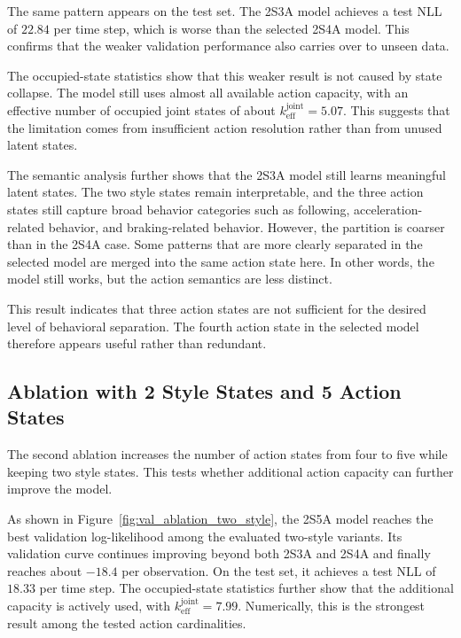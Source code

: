 \par The same pattern appears on the test set. 
The 2S3A model achieves a test \ac{NLL} of \(22.84\) per time step, which is worse than the selected 2S4A model. 
This confirms that the weaker validation performance also carries over to unseen data.

\par The occupied-state statistics show that this weaker result is not caused by state collapse. 
The model still uses almost all available action capacity, with an effective number of occupied joint states of about \(k_{\mathrm{eff}}^{\mathrm{joint}}=5.07\). 
This suggests that the limitation comes from insufficient action resolution rather than from unused latent states.


\par The semantic analysis further shows that the 2S3A model still learns meaningful latent states. 
The two style states remain interpretable, and the three action states still capture broad behavior categories such as following, acceleration-related behavior, 
and braking-related behavior. 
However, the partition is coarser than in the 2S4A case. 
Some patterns that are more clearly separated in the selected model are merged into the same action state here.  
In other words, the model still works, but the action semantics are less distinct.

\par This result indicates that three action states are not sufficient for the desired level of behavioral separation. 
The fourth action state in the selected model therefore appears useful rather than redundant.


\subsection{Ablation with 2 Style States and 5 Action States}
The second ablation increases the number of action states from four to five while keeping two style states. 
This tests whether additional action capacity can further improve the model.

\par As shown in Figure~\ref{fig:val_ablation_two_style}, the 2S5A model reaches the best validation log-likelihood among the evaluated two-style variants. 
Its validation curve continues improving beyond both 2S3A and 2S4A and finally reaches about \(-18.4\) per observation. 
On the test set, it achieves a test \ac{NLL} of \(18.33\) per time step. The occupied-state statistics further show that the additional capacity is actively used, 
with \(k_{\mathrm{eff}}^{\mathrm{joint}}=7.99\).
Numerically, this is the strongest result among the tested action cardinalities.

